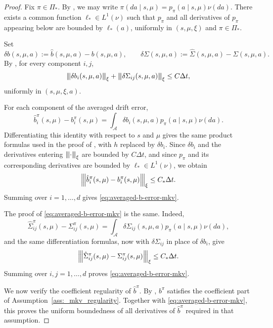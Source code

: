 \documentclass[a4paper, 10pt, english, reqno]{amsart}
\newcommand{\tnorm}[1]{\left\vert\kern-0.25ex\left\vert\kern-0.25ex\left\vert #1
\right\vert\kern-0.25ex\right\vert\kern-0.25ex\right\vert}
\begin{document}
\begin{proof}
Fix $\pi\in\Pi_*$. By , we may write
$\pi(da\mid s,\mu)=p_\pi(a\mid s,\mu)\nu(da)$. There exists a common function $\ell_*\in L^1(\nu)$ such that $p_\pi$ and all derivatives of $p_\pi$ appearing below are bounded by $\ell_*(a)$, uniformly in $(s,\mu,\xi)$ and $\pi\in\Pi_*$.

Set
\[
\delta b(s,\mu,a):=\hat b(s,\mu,a)-b(s,\mu,a),
\qquad
\delta\Sigma(s,\mu,a):=\hat\Sigma(s,\mu,a)-\Sigma(s,\mu,a).
\]
By , for every
component $i,j$,
\[
\tnorm{\delta b_i(s,\mu,a)}_\xi
+
\tnorm{\delta\Sigma_{ij}(s,\mu,a)}_\xi
\le C\Delta t,
\]
uniformly in $(s,\mu,\xi,a)$.

For each component of the averaged drift error,
\[
\hat b_i^\pi(s,\mu)-b_i^\pi(s,\mu)
=
\int_{\mathcal A}\delta b_i(s,\mu,a)p_\pi(a\mid s,\mu)\nu(da).
\]
Differentiating this identity with respect to $s$ and $\mu$ gives the
same product formulas used in the proof of
, with $h$ replaced by
$\delta b_i$. Since $\delta b_i$ and the derivatives entering
$\tnorm{\cdot}_\xi$ are bounded by $C\Delta t$, and since $p_\pi$ and
its corresponding derivatives are bounded by $\ell_*\in L^1(\nu)$, we
obtain
\[
\tnorm{\hat b_i^\pi(s,\mu)-b_i^\pi(s,\mu)}_\xi
\le C_*\Delta t.
\]
Summing over $i=1,\dots,d$ gives \eqref{eq:averaged-b-error-mkv}.

The proof of \eqref{eq:averaged-b-error-mkv} is the same. Indeed,
\[
\hat\Sigma_{ij}^\pi(s,\mu)-\Sigma_{ij}^\pi(s,\mu)
=
\int_{\mathcal A}
\delta\Sigma_{ij}(s,\mu,a)p_\pi(a\mid s,\mu)\nu(da),
\]
and the same differentiation formulas, now with
$\delta\Sigma_{ij}$ in place of $\delta b_i$, give
\[
\tnorm{\hat\Sigma_{ij}^\pi(s,\mu)-\Sigma_{ij}^\pi(s,\mu)}_\xi
\le C_*\Delta t.
\]
Summing over $i,j=1,\dots,d$ proves
\eqref{eq:averaged-b-error-mkv}.

We now verify the coefficient regularity of $\hat b^\pi$. By
, $b^\pi$ satisfies the
coefficient part of Assumption~\ref{ass:_mkv_regularity}. Together with
\eqref{eq:averaged-b-error-mkv}, this proves the uniform boundedness of
all derivatives of $\hat b^\pi$ required in that assumption.


\end{proof}
\end{document}
